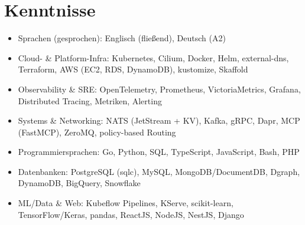 \documentclass[10pt,a4paper]{resume}
\begin{document}
\section{Kenntnisse}

\begin{itemize}[leftmargin=1.4em,nosep,topsep=2pt]
  \item Sprachen (gesprochen): Englisch (fließend), Deutsch (A2)
  \item Cloud- \& Platform-Infra: Kubernetes, Cilium, Docker, Helm, external-dns, Terraform, AWS (EC2, RDS, DynamoDB), kustomize, Skaffold
  \item Observability \& SRE: OpenTelemetry, Prometheus, VictoriaMetrics, Grafana, Distributed Tracing, Metriken, Alerting
  \item Systems \& Networking: NATS (JetStream + KV), Kafka, gRPC, Dapr, MCP (FastMCP), ZeroMQ, policy-based Routing
  \item Programmiersprachen: Go, Python, SQL, TypeScript, JavaScript, Bash, PHP
  \item Datenbanken: PostgreSQL (sqlc), MySQL, MongoDB/DocumentDB, Dgraph, DynamoDB, BigQuery, Snowflake
  \item ML/Data \& Web: Kubeflow Pipelines, KServe, scikit-learn, TensorFlow/Keras, pandas, ReactJS, NodeJS, NestJS, Django
\end{itemize}
\end{document}
